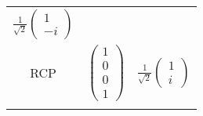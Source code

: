 \documentclass{standalone}
\begin{document}
\begin{tabular}{c c c}
        $\frac{1}{\sqrt{2}}\begin{pmatrix} 1 \\ -i \end{pmatrix}$  \\
        \addlinespace[1.5ex]
        RCP & 
        $\begin{pmatrix} 1 \\ 0 \\ 0 \\ 1 \end{pmatrix}$ & 
        $\frac{1}{\sqrt{2}}\begin{pmatrix} 1 \\ i \end{pmatrix}$  \\
        \addlinespace[2ex]
        \bottomrule
    \end{tabular}
\end{document}
